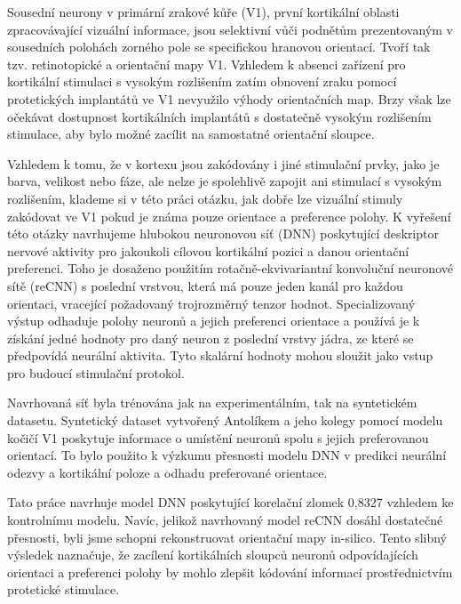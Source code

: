 \documentclass[12pt]{report}
\begin{document}
Sousední neurony v primární zrakové kůře (V1), první kortikální oblasti zpracovávající vizuální informace, jsou selektivní vůči podnětům prezentovaným v sousedních polohách zorného pole se specifickou hranovou orientací. Tvoří tak tzv. retinotopické a orientační mapy V1. Vzhledem k absenci zařízení pro kortikální stimulaci s vysokým rozlišením zatím obnovení zraku pomocí protetických implantátů ve V1 nevyužilo výhody orientačních map. Brzy však lze očekávat dostupnost kortikálních implantátů s dostatečně vysokým rozlišením stimulace, aby bylo možné zacílit na samostatné orientační sloupce.

Vzhledem k tomu, že v kortexu jsou zakódovány i jiné stimulační prvky, jako je barva, velikost nebo fáze, ale nelze je spolehlivě zapojit ani stimulací s vysokým rozlišením, klademe si v této práci otázku, jak dobře lze vizuální stimuly zakódovat ve V1 pokud je známa pouze orientace a preference polohy. K vyřešení této otázky navrhujeme hlubokou neuronovou síť (DNN) poskytující deskriptor nervové aktivity pro jakoukoli cílovou kortikální pozici a danou orientační preferenci. Toho je dosaženo použitím rotačně-ekvivariantní konvoluční neuronové sítě (reCNN) s poslední vrstvou, která má pouze jeden kanál pro každou orientaci, vracející požadovaný trojrozměrný tenzor hodnot. Specializovaný výstup odhaduje polohy neuronů a jejich preferenci orientace a používá je k získání jedné hodnoty pro daný neuron z poslední vrstvy jádra, ze které se předpovídá neurální aktivita. Tyto skalární hodnoty mohou sloužit jako vstup pro budoucí stimulační protokol.

Navrhovaná síť byla trénována jak na experimentálním, tak na syntetickém datasetu. Syntetický dataset vytvořený Antolíkem a jeho kolegy pomocí modelu kočičí V1 poskytuje informace o umístění neuronů spolu s jejich preferovanou orientací. To bylo použito k výzkumu přesnosti modelu DNN v predikci neurální odezvy a kortikální poloze a odhadu preferované orientace.

Tato práce navrhuje model DNN poskytující korelační zlomek 0,8327 vzhledem ke kontrolnímu modelu. Navíc, jelikož navrhovaný model reCNN dosáhl dostatečné přesnosti, byli jsme schopni rekonstruovat orientační mapy in-silico. Tento slibný výsledek naznačuje, že zacílení kortikálních sloupců neuronů odpovídajících orientaci a preferenci polohy by mohlo zlepšit kódování informací prostřednictvím protetické stimulace.
\end{document}
